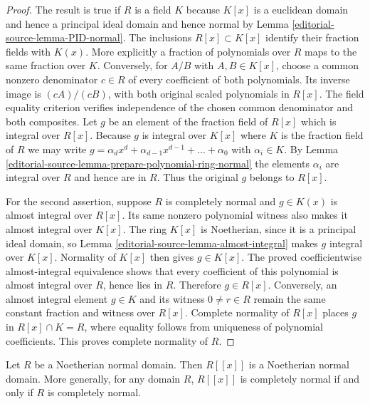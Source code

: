 \begin{proof}
The result is true if $R$ is a field $K$ because
$K[x]$ is a euclidean domain and hence a principal ideal
domain and hence normal by Lemma \ref{editorial-source-lemma-PID-normal}.
The inclusions $R[x]\subset K[x]$ identify their fraction fields
with $K(x)$. More explicitly a fraction of polynomials over $R$
maps to the same fraction over $K$. Conversely, for $A/B$ with
$A,B\in K[x]$, choose a common nonzero denominator $c\in R$
of every coefficient of both polynomials. Its inverse image is
$(cA)/(cB)$, with both original scaled polynomials in $R[x]$.
The field equality criterion verifies independence of the chosen
common denominator and both composites.
Let $g$ be an element of the fraction field of
$R[x]$ which is integral over $R[x]$. Because $g$
is integral over $K[x]$ where $K$ is the fraction
field of $R$ we may write $g = \alpha_d x^d + \alpha_{d-1}x^{d-1} +
\ldots + \alpha_0$ with $\alpha_i \in K$.
By Lemma \ref{editorial-source-lemma-prepare-polynomial-ring-normal}
the elements $\alpha_i$ are integral over $R$ and
hence are in $R$. Thus the original $g$ belongs to $R[x]$.

For the second assertion, suppose $R$ is completely normal and
$g\in K(x)$ is almost integral over $R[x]$. Its same nonzero
polynomial witness also makes it almost integral over $K[x]$.
The ring $K[x]$ is Noetherian, since it is a principal ideal
domain, so Lemma \ref{editorial-source-lemma-almost-integral} makes $g$ integral
over $K[x]$. Normality of $K[x]$ then gives $g\in K[x]$.
The proved coefficientwise almost-integral equivalence shows
that every coefficient of this polynomial is almost integral
over $R$, hence lies in $R$. Therefore $g\in R[x]$.
Conversely, an almost integral element $g\in K$ and its witness
$0\ne r\in R$ remain the same constant fraction and witness
over $R[x]$. Complete normality of $R[x]$ places $g$ in
$R[x]\cap K=R$, where equality follows from uniqueness of
polynomial coefficients. This proves complete normality of $R$.
\end{proof}

\begin{lemma}
\label{editorial-source-lemma-power-series-over-Noetherian-normal-domain}
Let $R$ be a Noetherian normal domain. Then $R[[x]]$ is
a Noetherian normal domain. More generally, for any domain $R$,
$R[[x]]$ is completely normal if and only if $R$ is completely normal.
\end{lemma}

